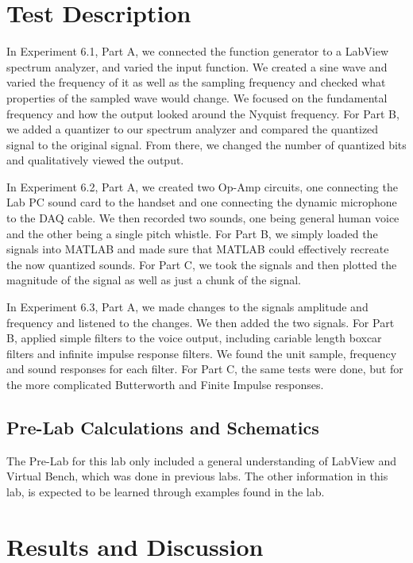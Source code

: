 \documentclass[10pt]{article}
\begin{document}
\section{Test Description}

In Experiment 6.1, Part A, we connected the function generator to a LabView spectrum analyzer, and varied the input function. We created a sine wave and varied the frequency of it as well as the sampling frequency and checked what properties of the sampled wave would change. We focused on the fundamental frequency and how the output looked around the Nyquist frequency. For Part B, we added a quantizer to our spectrum analyzer and compared the quantized signal to the original signal. From there, we changed the number of quantized bits and qualitatively viewed the output.

In Experiment 6.2, Part A, we created two Op-Amp circuits, one connecting the Lab PC sound card to the handset and one connecting the dynamic microphone to the DAQ cable. We then recorded two sounds, one being general human voice and the other being a single pitch whistle. For Part B, we simply loaded the signals into MATLAB and made sure that MATLAB could effectively recreate the now quantized sounds. For Part C, we took the signals and then plotted the magnitude of the signal as well as just a chunk of the signal.

In Experiment 6.3, Part A, we made changes to the signals amplitude and frequency and listened to the changes. We then added the two signals. For Part B, applied simple filters to the voice output, including cariable length boxcar filters and infinite impulse response filters. We found the unit sample, frequency and sound responses for each filter. For Part C, the same tests were done, but for the more complicated Butterworth and Finite Impulse responses.
 

\subsection{Pre-Lab Calculations and Schematics}

The Pre-Lab for this lab only included a general understanding of LabView and Virtual Bench, which was done in previous labs. The other information in this lab, is expected to be learned through examples found in the lab. 

\section{Results and Discussion}
\end{document}
